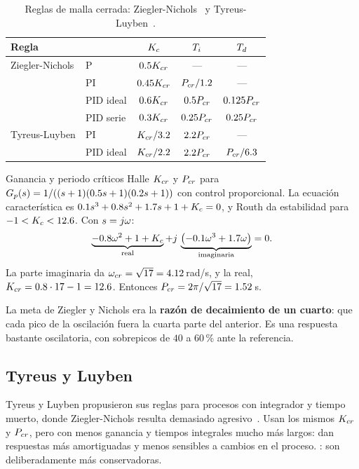 \begin{table}[ht]
\centering
\caption{Reglas de malla cerrada: Ziegler-Nichols~\citep{ZiNi42} y Tyreus-Luyben~\citep{TyLu92}.}
\label{tab:ps-cerrada}
\renewcommand{\arraystretch}{1.3}
\begin{tabular}{@{}llccc@{}}
\toprule
Regla & & $K_c$ & $T_i$ & $T_d$\\
\midrule
Ziegler-Nichols & P & $0.5K_{cr}$ & --- & ---\\
 & PI & $0.45K_{cr}$ & $P_{cr}/1.2$ & ---\\
 & PID ideal & $0.6K_{cr}$ & $0.5P_{cr}$ & $0.125P_{cr}$\\
 & PID serie & $0.3K_{cr}$ & $0.25P_{cr}$ & $0.25P_{cr}$\\
\midrule
Tyreus-Luyben & PI & $K_{cr}/3.2$ & $2.2P_{cr}$ & ---\\
 & PID ideal & $K_{cr}/2.2$ & $2.2P_{cr}$ & $P_{cr}/6.3$\\
\bottomrule
\end{tabular}
\end{table}

\begin{ejemplo}[label=ej:ps-critico]{Ganancia y periodo críticos}
Halle $K_{cr}$ y $P_{cr}$ para $G_p(s)=1/((s+1)(0.5s+1)(0.2s+1))$ con control proporcional.
\solucion La ecuación característica es $0.1s^3+0.8s^2+1.7s+1+K_c=0$, y Routh da estabilidad para $-1<K_c<12.6$. Con $s=j\omega$:
\[
  \underbrace{-0.8\omega^2+1+K_c}_{\text{real}}+j\,\underbrace{\bigl(-0.1\omega^3+1.7\omega\bigr)}_{\text{imaginaria}}=0 .
\]
La parte imaginaria da $\omega_{cr}=\sqrt{17}=4.12$\,rad/s, y la real, $K_{cr}=0.8\cdot17-1=12.6$. Entonces $P_{cr}=2\pi/\sqrt{17}=1.52$\,s.
\end{ejemplo}

La meta de Ziegler y Nichols era la \textbf{razón de decaimiento de un cuarto}: que cada pico de la oscilación fuera la cuarta parte del anterior. Es una respuesta bastante oscilatoria, con sobrepicos de $40$ a $60$\,\% ante la referencia.

\subsection{Tyreus y Luyben}

Tyreus y Luyben propusieron sus reglas para procesos con integrador y tiempo muerto, donde Ziegler-Nichols resulta demasiado agresivo~\citep{TyLu92}. Usan los mismos $K_{cr}$ y $P_{cr}$, pero con menos ganancia y tiempos integrales mucho más largos: dan respuestas más amortiguadas y menos sensibles a cambios en el proceso. : son deliberadamente más conservadoras.

